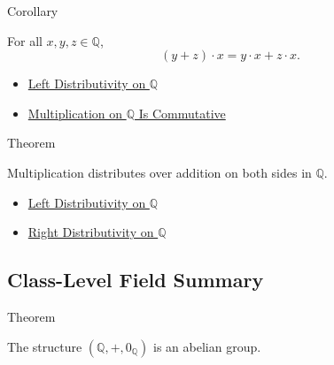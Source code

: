 \begin{corollarybox}{Corollary}
\begin{corollary}
\label{cor:right-distributivity-on-q}
For all $x,y,z\in\mathbb{Q}$,
\[
(y+z)\cdot x=y\cdot x+z\cdot x.
\]
\end{corollary}
\end{corollarybox}

\begin{dependencies}
\begin{itemize}
  \item \hyperref[thm:left-distributivity-on-q]{Left Distributivity on $\mathbb{Q}$}
  \item \hyperref[thm:multiplication-on-q-commutative]{Multiplication on $\mathbb{Q}$ Is Commutative}
\end{itemize}
\end{dependencies}

\begin{theorembox}{Theorem}
\begin{theorem}
\label{thm:multiplication-distributes-over-addition-on-q}
Multiplication distributes over addition on both sides in $\mathbb{Q}$.
\end{theorem}
\end{theorembox}

\begin{dependencies}
\begin{itemize}
  \item \hyperref[thm:left-distributivity-on-q]{Left Distributivity on $\mathbb{Q}$}
  \item \hyperref[cor:right-distributivity-on-q]{Right Distributivity on $\mathbb{Q}$}
\end{itemize}
\end{dependencies}

\subsection*{Class-Level Field Summary}

\begin{theorembox}{Theorem}
\begin{theorem}
\label{thm:q-additive-abelian-group}
The structure $(\mathbb{Q},+,0_{\mathbb{Q}})$ is an abelian group.
\end{theorem}
\end{theorembox}

